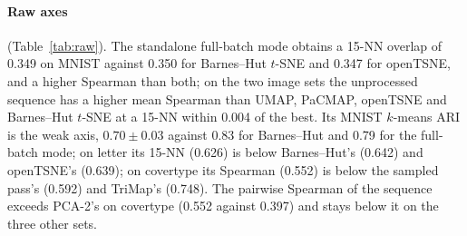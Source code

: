 \documentclass[10pt,twocolumn]{article}
\newcommand{\knn}{15-NN}
\begin{document}
\begin{table}[t]
\centering\footnotesize
\caption{Raw axes of every configuration as shipped, mean over the five matched-control runs. Run standard
deviations (\texttt{k41}): at most 0.01 on \knn{} everywhere, at most 0.04 on Spearman (covertype UMAP) and at most
0.07 on ARI (densMAP 0.07, PaCMAP 0.06, h-NNE 0.04, openTSNE 0.03, MNIST sequence 0.03). Bold: best of the column, underlined: second, among the ten ranked configurations; PCA-2 and PCA-2 refined by our pass are reference rows below the rule, not ranked.}
\label{tab:raw}
\setlength{\tabcolsep}{4pt}

\end{table}

\paragraph{Raw axes} (Table~\ref{tab:raw}). The standalone full-batch mode obtains a \knn{} overlap of 0.349 on
MNIST against 0.350 for Barnes--Hut $t$-SNE and 0.347 for openTSNE, and a higher Spearman than both; on the two
image sets the unprocessed sequence has a higher mean Spearman than UMAP, PaCMAP, openTSNE and Barnes--Hut $t$-SNE
at a \knn{} within 0.004 of the best. Its MNIST $k$-means ARI is the weak axis, $0.70 \pm 0.03$ against 0.83 for
Barnes--Hut and 0.79 for the full-batch mode; on letter its \knn{} (0.626) is below Barnes--Hut's (0.642) and
openTSNE's (0.639); on covertype its Spearman (0.552) is below the sampled pass's (0.592) and TriMap's (0.748). The
pairwise Spearman of the sequence exceeds PCA-2's on covertype (0.552 against 0.397) and stays below it on the
three other sets.
\end{document}
